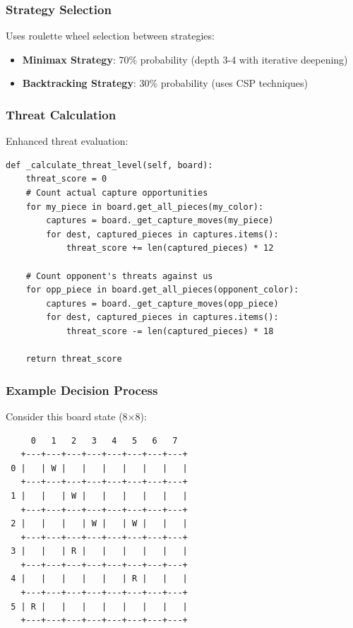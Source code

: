\documentclass[12pt,a4paper]{article}
\begin{document}
\subsubsection{Strategy Selection}

Uses roulette wheel selection between strategies:
\begin{itemize}
    \item \textbf{Minimax Strategy}: 70\% probability (depth 3-4 with iterative deepening)
    \item \textbf{Backtracking Strategy}: 30\% probability (uses CSP techniques)
\end{itemize}

\subsubsection{Threat Calculation}

Enhanced threat evaluation:
\begin{lstlisting}[caption={Threat Level Calculation}]
def _calculate_threat_level(self, board):
    threat_score = 0
    # Count actual capture opportunities
    for my_piece in board.get_all_pieces(my_color):
        captures = board._get_capture_moves(my_piece)
        for dest, captured_pieces in captures.items():
            threat_score += len(captured_pieces) * 12
    
    # Count opponent's threats against us
    for opp_piece in board.get_all_pieces(opponent_color):
        captures = board._get_capture_moves(opp_piece)
        for dest, captured_pieces in captures.items():
            threat_score -= len(captured_pieces) * 18
    
    return threat_score
\end{lstlisting}

\subsubsection{Example Decision Process}

Consider this board state (8×8):

\begin{verbatim}
     0   1   2   3   4   5   6   7
   +---+---+---+---+---+---+---+---+
 0 |   | W |   |   |   |   |   |   |
   +---+---+---+---+---+---+---+---+
 1 |   |   | W |   |   |   |   |   |
   +---+---+---+---+---+---+---+---+
 2 |   |   |   | W |   | W |   |   |
   +---+---+---+---+---+---+---+---+
 3 |   |   | R |   |   |   |   |   |
   +---+---+---+---+---+---+---+---+
 4 |   |   |   |   |   | R |   |   |
   +---+---+---+---+---+---+---+---+
 5 | R |   |   |   |   |   |   |   |
   +---+---+---+---+---+---+---+---+
\end{verbatim}
\end{document}
